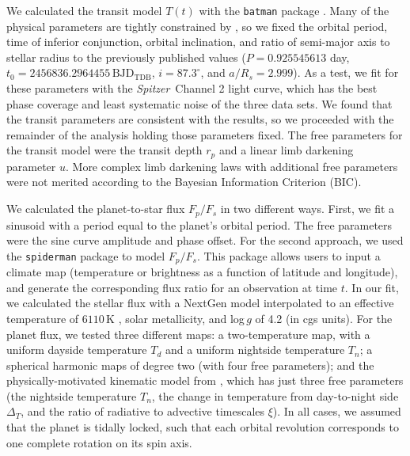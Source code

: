\documentclass[twocolumn]{aastex61}
\newcommand{\project}[1]{\textsl{#1}}
\newcommand{\Spitzer}{\project{Spitzer}}
\begin{document}
We calculated the transit model $T(t)$ with the \texttt{batman} package \citep{kreidberg15a}. Many of the physical parameters are tightly constrained by \cite{southworth15}, so we fixed the orbital period, time of inferior conjunction, orbital inclination, and ratio of semi-major axis to stellar radius to the previously published values ($P = 0.925545613$ day, $t_0 = 2456836.2964455\,\mathrm{BJD_{TDB}}$, $i = 87.3^\circ$, and $a/R_s = 2.999$). As a test, we fit for these parameters with the \Spitzer\ Channel 2 light curve, which has the best phase coverage and least systematic noise of the three data sets. We found that the transit parameters are consistent with the \cite{southworth15} results, so we proceeded with the remainder of the analysis holding those parameters fixed.  The free parameters for the transit model were the transit depth $r_p$ and a linear limb darkening parameter $u$. More complex limb darkening laws with additional free parameters were not merited according to the Bayesian Information Criterion (BIC).

We calculated the planet-to-star flux $F_p/F_s$ in two different ways. First, we fit a sinusoid with a period equal to the planet's orbital period. The free parameters were the sine curve amplitude and phase offset. For the second approach, we used the \texttt{spiderman} package \citep{louden17} to model $F_p/F_s$. This package allows users to input a climate map (temperature or brightness as a function of latitude and longitude), and generate the corresponding flux ratio for an observation at time $t$.  In our fit, we calculated the stellar flux with a NextGen model \citep{allard12} interpolated to an effective temperature of $6110\,\mathrm{K}$ \citep{gillon14}, solar metallicity, and log\,$g$ of 4.2 (in cgs units).  For the planet flux, we tested three different maps: a two-temperature map, with a uniform dayside temperature $T_d$ and a uniform nightside temperature $T_n$; a spherical harmonic maps of degree two (with four free parameters); and the physically-motivated kinematic model from \cite{zhang17}, which has just three free parameters (the nightside temperature $T_n$, the change in temperature from day-to-night side $\Delta_T$, and the ratio of radiative to advective timescales $\xi$).  In all cases, we assumed that the planet is tidally locked, such that each orbital revolution corresponds to one complete rotation on its spin axis. 
\end{document}
